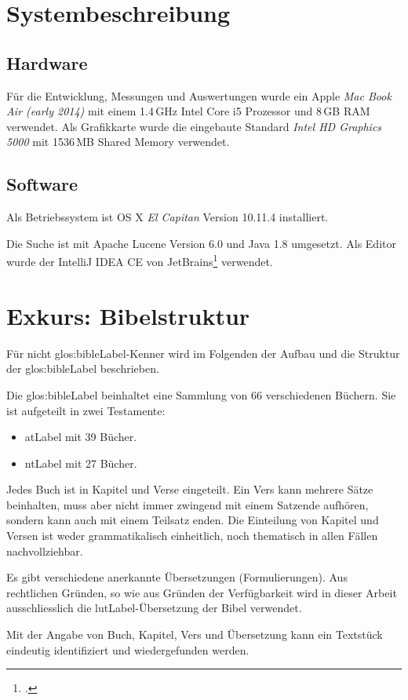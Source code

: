 \section{Systembeschreibung}
\subsection{Hardware}
Für die Entwicklung, Messungen und Auswertungen wurde ein Apple \textit{Mac Book Air (early 2014)} mit einem 1.4\,GHz Intel Core i5 Prozessor und 8\,GB RAM verwendet. Als Grafikkarte wurde die eingebaute Standard \textit{Intel HD Graphics 5000} mit 1536\,MB Shared Memory verwendet.

\subsection{Software}
Als Betriebssystem ist OS X \textit{El Capitan} Version 10.11.4  installiert.

Die Suche ist mit Apache Lucene Version 6.0 und Java 1.8 umgesetzt. Als Editor wurde der IntelliJ IDEA CE von JetBrains\footcite{IntelliJ_IDEA_the_Java_IDE_2016-05-09} verwendet.

\section{Exkurs: Bibelstruktur}
Für nicht \gls{glos:bibleLabel}-Kenner wird im Folgenden der Aufbau und die Struktur der \gls{glos:bibleLabel} beschrieben.

Die \gls{glos:bibleLabel} beinhaltet eine Sammlung von 66 verschiedenen Büchern.
Sie ist aufgeteilt in zwei Testamente:
\begin{itemize}[noitemsep]
	\item \gls{atLabel} mit 39 Bücher.
	\item \gls{ntLabel} mit 27 Bücher.
\end{itemize}
Jedes Buch ist in Kapitel und Verse eingeteilt. Ein Vers kann mehrere Sätze beinhalten, muss aber nicht immer zwingend mit einem Satzende aufhören, sondern kann auch mit einem Teilsatz enden.
Die Einteilung von Kapitel und Versen ist weder grammatikalisch einheitlich, noch thematisch in allen Fällen nachvollziehbar.

Es gibt verschiedene anerkannte Übersetzungen (Formulierungen).
Aus rechtlichen Gründen, so wie aus Gründen der Verfügbarkeit wird in dieser Arbeit ausschliesslich die \gls{lutLabel}-Übersetzung der Bibel verwendet.

Mit der Angabe von Buch, Kapitel, Vers und Übersetzung kann ein Textstück eindeutig identifiziert und wiedergefunden werden.

